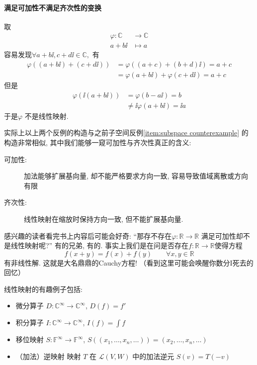 \paragraph{满足可加性不满足齐次性的变换}
取
\begin{align*}
    \varphi: \mathbb{C} &\to \mathbb{C} \\
    a+b \ii &\mapsto a
\end{align*}
容易发现\(\forall a+b\ii,c+d\ii \in \mathbb{C},\) 有
\begin{align*}
    \varphi((a+b\ii)+(c+d\ii)) &= \varphi((a+c)+(b+d)\ii) = a+c \\
    &=\varphi(a+b\ii) + \varphi(c+d\ii) =a+c
\end{align*}
但是
\begin{align*}
    \varphi(\ii(a+b\ii)) &= \varphi(b-a\ii) = b \\
    &\neq \ii\varphi(a+b\ii) =\ii a
\end{align*}
于是\(\varphi\) 不是线性映射.

实际上以上两个反例的构造与之前子空间反例\ref{item:subspace
counterexample}
的构造非常相似, 其中我们能够一窥可加性与齐次性真正的含义:
\begin{description}
    \item[可加性:] 加法能够扩展基向量, 却不能严格要求方向一致, 容易导致值域离散或方向有限
    \item[齐次性:] 线性映射在缩放时保持方向一致, 但不能扩展基向量.
\end{description}

感兴趣的读者看完书上内容后可能会好奇: ``那存不存在\(\varphi: \mathbb{R} \to
\mathbb{R}\) 满足可加性却不是线性映射呢?'' 有的兄弟, 有的.
事实上我们是在问是否存在\(f:\mathbb{R} \to \mathbb{R}\)使得方程
\[
    f(x+y) = f(x) + f(y) \qquad \forall x,y \in \mathbb{R}
\]
有非线性解. 这就是大名鼎鼎的Cauchy方程! （看到这里可能会唤醒你数分I死去的回忆）

线性映射的有趣例子包括:
\begin{itemize}
    \item 微分算子 \(D: \mathbb{C}^{\infty} \to
        \mathbb{C}^{\infty}\), \(D(f) = f'\)
    \item 积分算子 \(I: \mathbb{C}^{\infty} \to
        \mathbb{C}^{\infty}\), \(I(f) = \int f\)
    \item 移位映射 \(S: \mathbb{F}^{\infty} \to \mathbb{F}^{\infty}\),
        \(S((x_{1},\ldots, x_{n}, \ldots)) = (x_{2},\ldots,
        x_{n}, \ldots)\)
    \item （加法）逆映射 映射 \(T\) 在 \(\mathscr{L}(V,W)\) 中的加法逆元
        \(S(v)=T(-v)\)
\end{itemize}
